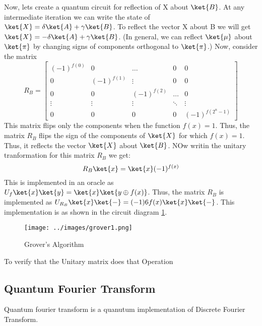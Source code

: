 \documentclass[12pt, oneside]{book}
\theoremstyle{definition}
\theoremstyle{definition}
\theoremstyle{remark}
\begin{document}
Now, lets create a quantum circuit for reflection of X about $\ket{B}$. 
At any intermediate iteration we can write the state of $\ket{X}=\delta \ket{A}+\gamma \ket{B}$.
To reflect the vector X about B we will get $\ket{X}=-\delta \ket{A}+\gamma \ket{B}$. (In general, we can reflect $\ket{\mu}$ about $\ket{\pi}$ by changing signs of components orthogonal to $\ket{\pi}$.)
Now, consider the matrix
\[
    R_B=\begin{bmatrix}
        (-1)^{f(0)} & 0 & \ldots &0 & 0\\
        0 & (-1)^{f(1)} & \vdots & 0 & 0\\
        0 & 0 & (-1)^{f(2)} & \ldots & 0 \\ 
        \vdots & \vdots & \vdots & \ddots & \vdots \\
        0 & 0 & 0 & 0 & (-1)^{f(2^n-1)}
    \end{bmatrix}
\]
This matrix flips only the components when the function $f(x)=1$. Thus, the matrix $R_B$ flips the sign of the components of $\ket{X}$ for which $f(x)=1$.
Thus, it reflects the vector $\ket{X}$ about $\ket{B}$. NOw writin the unitary tranformation for this matrix $R_B$ we get:
\[
    R_B\ket{x}=\ket{x}(-1)^{f(x)}
\]
This is implemented in an oracle as $U_f\ket{x}\ket{y}=\ket{x}\ket{y\oplus f(x)}$. Thus, the matrix $R_B$ is implemented as $U_{R_B}\ket{x}\ket{-}=(-1)6{f(x)}\ket{x}\ket{-}$.
This implementation is as shown in the circuit diagram \ref{fig:grover1}.
\begin{figure}[H]
    \centering
    \texttt{[image: ../images/grover1.png]}
    \caption{Grover's Algorithm}
    \label{fig:grover1}
\end{figure}
To verify that the Unitary matrix does that Operation


\subsection{Quantum Fourier Transform}
Quantum fourier transform is a quanutum implementation of Discrete Fourier Transform.
\end{document}
